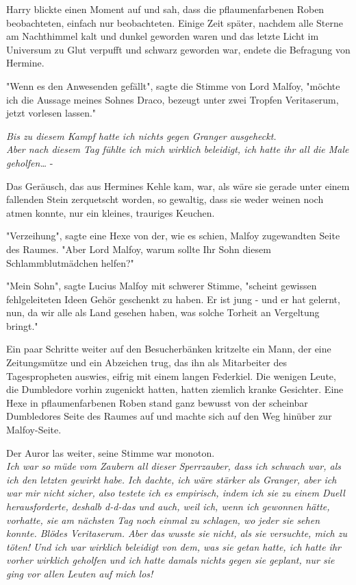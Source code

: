 {Harry blickte einen Moment auf und sah, dass die pflaumenfarbenen Roben\\ beobachteten, einfach nur beobachteten. Einige Zeit später, nachdem alle Sterne am Nachthimmel kalt und dunkel geworden waren und das letzte Licht im Universum zu Glut verpufft und schwarz geworden war, endete die Befragung von Hermine.

"Wenn es den Anwesenden gefällt", sagte die Stimme von Lord Malfoy, "möchte ich die Aussage meines Sohnes Draco, bezeugt unter zwei Tropfen Veritaserum, jetzt vorlesen lassen."

\emph{Bis zu diesem Kampf hatte ich nichts gegen Granger ausgeheckt.}\\ \emph{Aber nach diesem Tag fühlte ich mich wirklich beleidigt, ich hatte ihr all die Male geholfen…} -

Das Geräusch, das aus Hermines Kehle kam, war, als wäre sie gerade unter einem fallenden Stein zerquetscht worden, so gewaltig, dass sie weder weinen noch atmen konnte, nur ein kleines, trauriges Keuchen.

"Verzeihung", sagte eine Hexe von der, wie es schien, Malfoy zugewandten Seite des Raumes. "Aber Lord Malfoy, warum sollte Ihr Sohn diesem Schlammblutmädchen helfen?"

"Mein Sohn", sagte Lucius Malfoy mit schwerer Stimme, "scheint gewissen fehlgeleiteten Ideen Gehör geschenkt zu haben. Er ist jung - und er hat gelernt, nun, da wir alle als Land gesehen haben, was solche Torheit an Vergeltung bringt."

Ein paar Schritte weiter auf den Besucherbänken kritzelte ein Mann, der eine Zeitungsmütze und ein Abzeichen trug, das ihn als Mitarbeiter des Tagespropheten auswies, eifrig mit einem langen Federkiel. Die wenigen Leute, die Dumbledore vorhin zugenickt hatten, hatten ziemlich kranke Gesichter. Eine Hexe in pflaumenfarbenen Roben stand ganz bewusst von der scheinbar Dumbledores Seite des Raumes auf und machte sich auf den Weg hinüber zur Malfoy-Seite.

Der Auror las weiter, seine Stimme war monoton.\\ \emph{Ich war so müde vom Zaubern all dieser Sperrzauber, dass ich schwach war, als ich den letzten gewirkt habe. Ich dachte, ich wäre stärker als Granger, aber ich war mir nicht sicher, also testete ich es empirisch, indem ich sie zu einem Duell herausforderte,} \emph{deshalb d-d-das und auch, weil ich, wenn ich gewonnen hätte, vorhatte, sie am nächsten Tag noch einmal zu schlagen, wo jeder sie sehen konnte. Blödes Veritaserum. Aber das wusste sie nicht, als sie versuchte, mich zu töten! Und ich war wirklich beleidigt von dem, was sie getan hatte, ich hatte ihr vorher wirklich geholfen und ich hatte damals nichts gegen sie geplant, nur sie ging vor allen Leuten auf mich los!}

}
